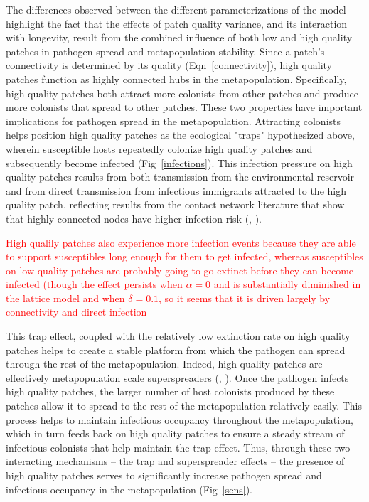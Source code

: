 \documentclass{svjour3}
\begin{document}
The differences observed between the different parameterizations of the model highlight the fact that the effects of patch quality variance, and its interaction with longevity, result from the combined influence of both low and high quality patches in pathogen spread and metapopulation stability.  Since a patch's connectivity is determined by its quality (Eqn~\ref{connectivity}), high quality patches function as highly connected hubs in the metapopulation.  Specifically, high quality patches both attract more colonists from other patches and produce more colonists that spread to other patches.  These two properties have important implications for pathogen spread in the metapopulation. Attracting colonists helps position high quality patches as the ecological "traps" hypothesized above, wherein susceptible hosts repeatedly colonize high quality patches and subsequently become infected (Fig~\ref{infections}).  This infection pressure on high quality patches results from both transmission from the environmental reservoir and from direct transmission from infectious immigrants attracted to the high quality patch, reflecting results from the contact network literature that show that highly connected nodes have higher infection risk (\cite{Christley2005}, \cite{Keeling2005}).  

\textcolor{red}{High qualily patches also experience more infection events because they are able to support susceptibles long enough for them to get infected, whereas susceptibles on low quality patches are probably going to go extinct before they can become infected (though the effect persists when $\alpha = 0$ and is substantially diminished in the lattice model and when $\delta = 0.1$, so it seems that it is driven largely by connectivity and direct infection}

This trap effect, coupled with the relatively low extinction rate on high quality patches helps to create a stable platform from which the pathogen can spread through the rest of the metapopulation.  Indeed, high quality patches are effectively metapopulation scale superspreaders (\cite{Lloyd-Smith2005}, \cite{Paull2012}).  Once the pathogen infects high quality patches, the larger number of host colonists produced by these patches allow it to spread to the rest of the metapopulation relatively easily.  This process helps to maintain infectious occupancy throughout the metapopulation, which in turn feeds back on high quality patches to ensure a steady stream of infectious colonists that help maintain the trap effect.  Thus, through these two interacting mechanisms -- the trap and superspreader effects -- the presence of high quality patches serves to significantly increase pathogen spread and infectious occupancy in the metapopulation (Fig~\ref{sens}).  
\end{document}
